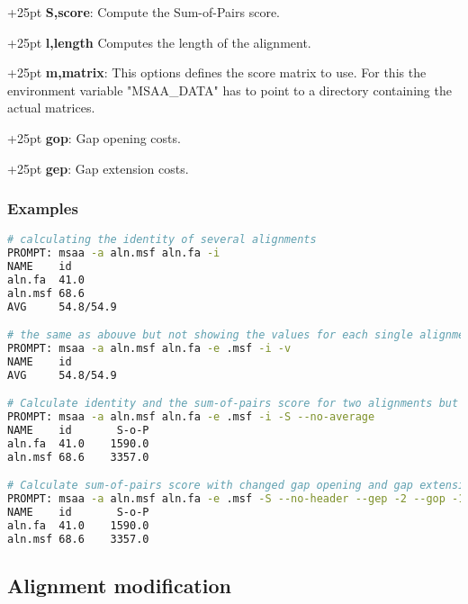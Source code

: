 \documentclass[a4paper,10pt,parskip=half]{scrartcl}
\begin{document}
\hangindent+25pt                          
\textbf{S,score}: Compute the Sum-of-Pairs score.

\hangindent+25pt 
\textbf{l,length} Computes the length of the alignment.

\hangindent+25pt 
\textbf{m,matrix}: This options defines the score matrix to use. For this the environment variable "MSAA\_DATA" has to point to a directory containing the actual matrices.

\hangindent+25pt 
\textbf{gop}: Gap opening costs.         

\hangindent+25pt 
\textbf{gep}: Gap extension costs.
                                                        
\subsubsection*{Examples}
\begin{lstlisting}[language=bash,frame=none,morekeywords={PROMPT}]
# calculating the identity of several alignments
PROMPT: msaa -a aln.msf aln.fa -i
NAME    id
aln.fa  41.0
aln.msf 68.6
AVG     54.8/54.9

# the same as abouve but not showing the values for each single alignment
PROMPT: msaa -a aln.msf aln.fa -e .msf -i -v
NAME    id
AVG     54.8/54.9

# Calculate identity and the sum-of-pairs score for two alignments but do not show the average
PROMPT: msaa -a aln.msf aln.fa -e .msf -i -S --no-average
NAME    id       S-o-P
aln.fa  41.0    1590.0
aln.msf 68.6    3357.0

# Calculate sum-of-pairs score with changed gap opening and gap extension consts for two alignments without showing the header
PROMPT: msaa -a aln.msf aln.fa -e .msf -S --no-header --gep -2 --gop -12
NAME    id       S-o-P
aln.fa  41.0    1590.0
aln.msf 68.6    3357.0
\end{lstlisting}


\newpage
\subsection{Alignment modification}\label{mod_opts}
\end{document}
